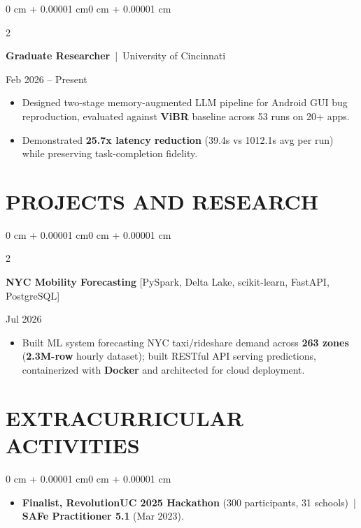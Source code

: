 \documentclass[10pt, letterpaper]{article}
\newenvironment{highlights}{
    \begin{itemize}[
        topsep=0.10 cm,
        parsep=0.06 cm,
        partopsep=0pt,
        itemsep=0.06 cm,
        leftmargin=12pt
    ]
}{
    \end{itemize}
}
\newenvironment{onecolentry}{
    \begin{adjustwidth}{0 cm + 0.00001 cm}{0 cm + 0.00001 cm}
}{
    \end{adjustwidth}
}
\newenvironment{twocolentry}[2][]{
    \onecolentry
    \def\secondColumn{#2}
    \setcolumnwidth{\fill, 4.5 cm}
    \begin{paracol}{2}
}{
    \switchcolumn \raggedleft \secondColumn
    \end{paracol}
    \endonecolentry
}
\begin{document}
\begin{twocolentry}{Feb 2026 -- Present}
\textbf{Graduate Researcher} \,|\, University of Cincinnati
\end{twocolentry}
\begin{highlights}
  \item Designed two-stage memory-augmented LLM pipeline for Android GUI bug reproduction, evaluated against \textbf{ViBR} baseline across 53 runs on 20+ apps.
  \item Demonstrated \textbf{25.7x latency reduction} (39.4s vs 1012.1s avg per run) while preserving task-completion fidelity.
\end{highlights}

\section{PROJECTS AND RESEARCH}
\begin{twocolentry}{Jul 2026}
\textbf{NYC Mobility Forecasting} [PySpark, Delta Lake, scikit-learn, FastAPI, PostgreSQL]
\end{twocolentry}
\begin{highlights}
  \item Built ML system forecasting NYC taxi/rideshare demand across \textbf{263 zones} (\textbf{2.3M-row} hourly dataset); built RESTful API serving predictions, containerized with \textbf{Docker} and architected for cloud deployment.
\end{highlights}

\section{EXTRACURRICULAR ACTIVITIES}
\begin{onecolentry}
\begin{highlights}
  \item \textbf{Finalist, RevolutionUC 2025 Hackathon} (300 participants, 31 schools) \,|\, \textbf{SAFe Practitioner 5.1} (Mar 2023).
\end{highlights}
\end{onecolentry}
\end{document}
